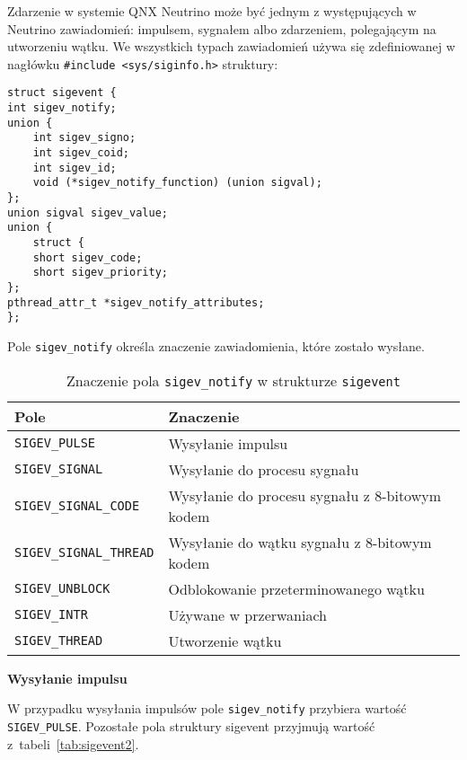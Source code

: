 Zdarzenie w systemie QNX Neutrino może być jednym z występujących w Neutrino zawiadomień: impulsem, sygnałem albo zdarzeniem, polegającym na utworzeniu wątku. We wszystkich typach zawiadomień używa się zdefiniowanej w nagłówku \lstinline[style=MyCStyle]{#include <sys/siginfo.h>} struktury:

\begin{lstlisting}[style=MyCStyle]
struct sigevent {
int sigev_notify;
union {
	int sigev_signo;
	int sigev_coid;
	int sigev_id;
	void (*sigev_notify_function) (union sigval);
};
union sigval sigev_value;
union {
	struct {
	short sigev_code;
	short sigev_priority;
};
pthread_attr_t *sigev_notify_attributes;
};
\end{lstlisting}

Pole \lstinline[style=MyCStyle]{sigev_notify} określa znaczenie zawiadomienia, które zostało wysłane.

\begin{table}[h!]
\centering
\caption{Znaczenie pola  \lstinline[style=MyCStyle]{sigev_notify} w strukturze  \lstinline[style=MyCStyle]{sigevent}}
\setlength{\arrayrulewidth}{1pt}
\setlength{\tabcolsep}{6pt}
\renewcommand{\arraystretch}{1.2}
\begin{tabular}{ |p{}|p{}|}
\hline \rowcolor{gray}
\textbf{Pole} & \textbf{Znaczenie} \\ \hline
\mbox{\lstinline[style=MyCStyle]{SIGEV_PULSE}} & Wysyłanie impulsu \\ \hline
\mbox{\lstinline[style=MyCStyle]{SIGEV_SIGNAL}} & Wysyłanie do procesu sygnału \\ \hline
\mbox{\lstinline[style=MyCStyle]{SIGEV_SIGNAL_CODE}} & Wysyłanie do procesu sygnału z 8-bitowym kodem \\ \hline
\mbox{\lstinline[style=MyCStyle]{SIGEV_SIGNAL_THREAD}} & Wysyłanie do wątku sygnału z 8-bitowym kodem \\ \hline
\mbox{\lstinline[style=MyCStyle]{SIGEV_UNBLOCK}} & Odblokowanie przeterminowanego wątku \\ \hline
\mbox{\lstinline[style=MyCStyle]{SIGEV_INTR}} & Używane w przerwaniach \\ \hline
\mbox{\lstinline[style=MyCStyle]{SIGEV_THREAD}} & Utworzenie wątku \\ \hline
\end{tabular}
\label{tab:sigevent}
\end{table}

\noindent
\textbf{Wysyłanie impulsu}

W przypadku wysyłania impulsów pole \lstinline[style=MyCStyle]{sigev_notify} przybiera wartość \lstinline[style=MyCStyle]{SIGEV_PULSE}. Pozostałe pola struktury sigevent przyjmują wartość z~tabeli~\ref{tab:sigevent2}.

